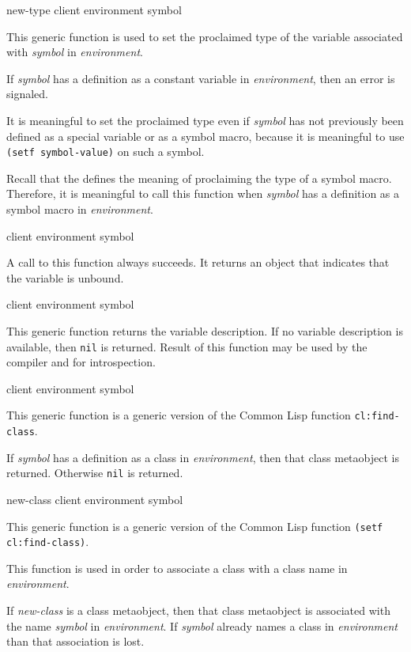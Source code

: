  {new-type client environment symbol}

This generic function is used to set the proclaimed type of the
variable associated with \textit{symbol} in \textit{environment}.

If \textit{symbol} has a definition as a constant variable in
\textit{environment}, then an error is signaled.

It is meaningful to set the proclaimed type even if \textit{symbol}
has not previously been defined as a special variable or as a symbol
macro, because it is meaningful to use \texttt{(setf symbol-value)} on
such a symbol.

Recall that the \hs{} defines the meaning of proclaiming the type of a
symbol macro.  Therefore, it is meaningful to call this function when
\textit{symbol} has a definition as a symbol macro in
\textit{environment}.

 {client environment symbol}

A call to this function always succeeds.  It returns an object that indicates
that the variable is unbound.

 {client environment symbol}

This generic function returns the variable description. If no variable
description is available, then \texttt{nil} is returned. Result of this
function may be used by the compiler and for introspection.

 {client environment symbol}

This generic function is a generic version of the Common Lisp function
\texttt{cl:find-class}.

If \textit{symbol} has a definition as a class in
\textit{environment}, then that class metaobject is returned.
Otherwise \texttt{nil} is returned.

 {new-class client environment symbol}

This generic function is a generic version of the Common Lisp function
\texttt{(setf cl:find-class)}.

This function is used in order to associate a class with a class name
in \textit{environment}.

If \textit{new-class} is a class metaobject, then that class
metaobject is associated with the name \textit{symbol} in
\textit{environment}.  If \textit{symbol} already names a class in
\textit{environment} than that association is lost.

